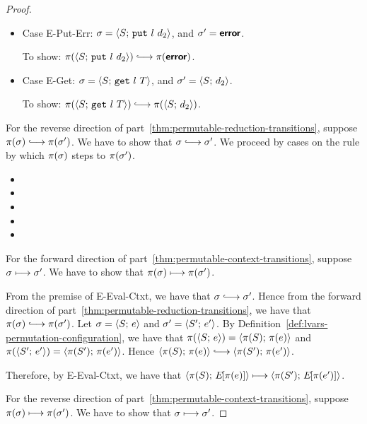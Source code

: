 \begin{proof}
\begin{itemize}
    \item Case {\sc E-Put-Err}: $\sigma = \langle S;\, \mbox{\texttt{put}}~l~d_2 \rangle$,
      and $\sigma' = \textbf{\textsf{error}}$.

      To show: $\pi(\config{S}{\putexp{l}{d_2}}) \parstepsto
      \pi(\error)$.


    \item Case {\sc E-Get}: $\sigma = \langle S;\, \mbox{\texttt{get}}~l~T \rangle$, and
      $\sigma' = \langle S;\, d_2 \rangle$.

      To show: $\pi(\config{S}{\getexp{l}{T}}) \parstepsto
      \pi(\config{S}{d_2})$.

  \end{itemize}

  For the reverse direction of
  part~\ref{thm:permutable-reduction-transitions}, suppose $\pi(\conf)
  \parstepsto \pi(\conf')$.  We have to show that $\conf \parstepsto
  \conf'$.  We proceed by cases on the rule by which $\pi(\sigma)$
  steps to $\pi(\sigma')$.

  \begin{itemize}
    \item {}
    \item {}
    \item {}
    \item {}
    \item {}
  \end{itemize}

  For the forward direction of
  part~\ref{thm:permutable-context-transitions}, suppose $\sigma
  \longmapsto \sigma'$.  We have to show that $\pi(\sigma) \longmapsto
  \pi(\sigma')$.

  From the premise of {\sc E-Eval-Ctxt}, we have that $\conf
  \parstepsto \conf'$.  Hence from the forward direction of
  part~\ref{thm:permutable-reduction-transitions}, we have that
  $\pi(\conf) \parstepsto \pi(\conf')$.  Let $\sigma = \langle S;\, e \rangle$
  and $\sigma' = \langle S';\, e' \rangle$.  By
  Definition~\ref{def:lvars-permutation-configuration}, we have that
  $\pi(\langle S;\, e \rangle) = \langle \pi(S);\, \pi(e) \rangle$ and
  $\pi(\langle S';\, e' \rangle) = \langle \pi(S');\, \pi(e') \rangle$.  Hence
  $\config{\pi(S)}{\pi(e)} \parstepsto \config{\pi(S')}{\pi(e')}$.

  Therefore, by {\sc E-Eval-Ctxt}, we have that
  $\langle \pi(S);\, E\hspace{-1mm}\left[\pi(e)\right] \rangle \longmapsto
  \langle \pi(S');\, E\hspace{-1mm}\left[\pi(e')\right] \rangle$.


  For the reverse direction of
  part~\ref{thm:permutable-context-transitions}, suppose $\pi(\sigma)
  \longmapsto \pi(\sigma')$.  We have to show that $\sigma \longmapsto
  \sigma'$.

\end{proof}
